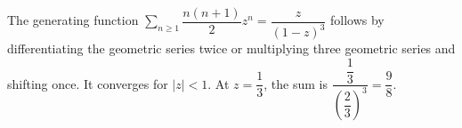 The generating function $\sum_{n\ge1}\dfrac{n(n+1)}{2}z^n=\dfrac{z}{(1-z)^3}$ follows by differentiating the geometric series twice or multiplying three geometric series and shifting once. It converges for $|z|<1 $. At $ z=\dfrac{1}{3}$, the sum is $\dfrac{\dfrac{1}{3}}{(\dfrac{2}{3})^3}=\boxed{\dfrac{9}{8}}$.
